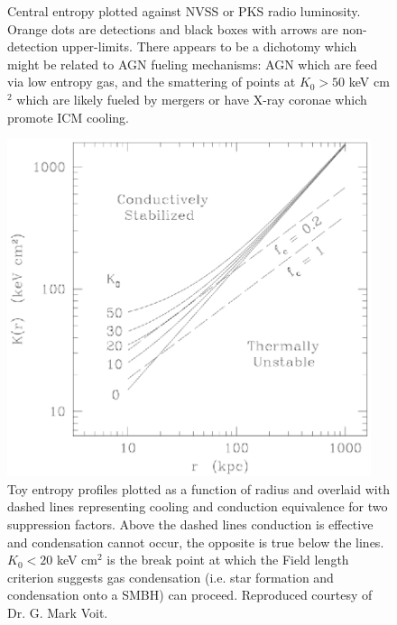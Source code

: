 \documentclass[11pt]{article}
\begin{document}
\begin{figure}[t]
\begin{minipage}[t]{0.5\linewidth}
        \caption{\small Central entropy plotted against NVSS or PKS radio
	luminosity. Orange dots are detections and black boxes with
	arrows are non-detection upper-limits. There appears to be a dichotomy which might be related to AGN
	fueling mechanisms: AGN which are feed via low entropy gas, and the
	smattering of points at $K_0 > 50$ keV cm$^2$ which are likely
	fueled by mergers or have X-ray coronae which promote ICM cooling.}
        \label{fig:rad}
    \end{minipage}
    \hspace{0.1in}
    \begin{minipage}[t]{0.5\linewidth}
        \centering
        \includegraphics*[width=0.95\textwidth, trim=0mm 0mm 0mm 0mm, clip]{conduction}
        \caption{\small 
        Toy entropy profiles plotted as a function of radius and overlaid with
        dashed lines representing cooling and conduction equivalence for two
        suppression factors. Above the dashed lines conduction is effective
        and condensation cannot occur, the opposite is true below the
        lines. $K_0 < 20$ keV cm$^2$ is the break point at which the Field
        length criterion suggests gas condensation (i.e. star formation and
        condensation onto a SMBH) can proceed. Reproduced courtesy of Dr. G.
        Mark Voit.}
        \label{fig:conduc}
    \end{minipage}
\end{figure}
\end{document}

